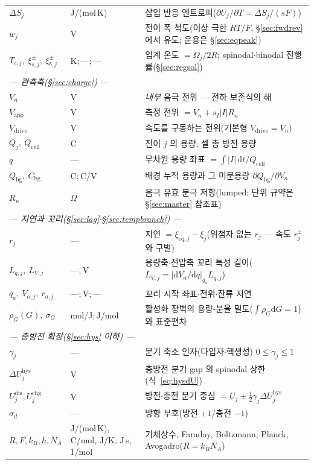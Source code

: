 \documentclass[11pt,a4paper]{article}
\newcommand{\dd}{\mathrm{d}}
\newcommand{\eq}{\mathrm{eq}}
\newcommand{\app}{\mathrm{app}}
\newcommand{\drive}{\mathrm{drive}}
\newcommand{\cell}{\mathrm{cell}}
\newcommand{\bg}{\mathrm{bg}}
\newcommand{\dis}{\mathrm{dis}}
\newcommand{\chg}{\mathrm{chg}}
\newcommand{\hys}{\mathrm{hys}}
\begin{document}
\begin{longtable}{p{} p{} p{}}
$\Delta S_j$ & J/(mol\,K) & 삽입 반응 엔트로피($\partial U_j/\partial T=\Delta S_j/(sF)$) \\
$w_j$ & V & 전이 폭 척도(이상 극한 $RT/F$, \S\ref{sec:fwdrev} 에서 유도; 운용은 \S\ref{sec:eqpeak}) \\
$T_{c,j},\ \xi_{s,j}^\pm,\ \xi_{b,j}^\pm$ & {\footnotesize K;\,---;\,---} & 임계 온도 $=\Omega_j/2R$; spinodal$\cdot$binodal 진행률(\S\ref{sec:regsol}) \\
\multicolumn{3}{l}{\emph{— 관측축(\S\ref{sec:charge}) —}}\\
$V_n$ & V & \emph{내부} 음극 전위 — 전하 보존식의 해 \\
$V_\app$ & V & 측정 전위 $=V_n+s_I|I|R_n$ \\
$V_\drive$ & V & 속도를 구동하는 전위(기본형 $V_\drive=V_n$) \\
$Q_j,\ Q_\cell$ & C & 전이 $j$ 의 용량, 셀 총 방전 용량 \\
$q$ & --- & 무차원 용량 좌표 $=\int|I|\,\dd t/Q_\cell$ \\
$Q_\bg,\ C_\bg$ & C;\,C/V & 배경 누적 용량과 그 미분용량 $\partial Q_\bg/\partial V_n$ \\
$R_n$ & $\Omega$ & 음극 유효 분극 저항(lumped; 단위 규약은 \S\ref{sec:master} 참조표) \\
\multicolumn{3}{l}{\emph{— 지연과 꼬리(\S\ref{sec:lag}$\cdot$\S\ref{sec:tempbranch}) —}}\\
$r_j$ & --- & 지연 $=\xi_{\eq,j}-\xi_j$(위첨자 없는 $r_j$ — 속도 $r_j^\pm$ 와 구별) \\
$L_{q,j},\ L_{V,j}$ & ---;\,V & 용량축$\cdot$전압축 꼬리 특성 길이($L_{V,j}=|\dd V_n/\dd q|_{q_a}L_{q,j}$) \\
$q_a,\ V_{a,j},\ r_{a,j}$ & ---;\,V;\,--- & 꼬리 시작 좌표$\cdot$전위$\cdot$잔류 지연 \\
$\rho_G(G),\ \sigma_G$ & mol/J;\,J/mol & 활성화 장벽의 용량-분율 밀도($\int\rho_G\dd G=1$)와 표준편차 \\
\multicolumn{3}{l}{\emph{— 충방전 확장(\S\ref{sec:hys} 이하) —}}\\
$\gamma_j$ & --- & 분기 축소 인자(다입자$\cdot$핵생성) $0\le\gamma_j\le1$ \\
$\Delta U_j^\hys$ & V & 충방전 분기 gap 의 spinodal 상한(식~\eqref{eq:hysdU}) \\
$U_j^{\dis},U_j^{\chg}$ & V & 방전$\cdot$충전 분기 중심 $=U_j\pm\tfrac12\gamma_j\Delta U_j^\hys$ \\
$\sigma_d$ & --- & 방향 부호(방전 $+1$/충전 $-1$) \\
$R,F,k_B,h,N_A$ & {\footnotesize J/(mol\,K), C/mol, J/K, J\,s, 1/mol} & 기체상수, Faraday, Boltzmann, Planck, Avogadro($R=k_BN_A$) \\
\bottomrule
\end{longtable}
\end{document}
